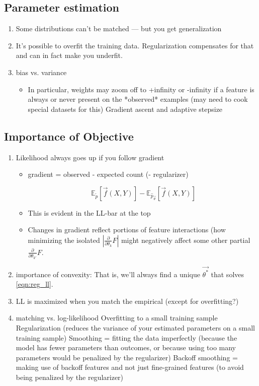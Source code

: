 \documentclass[11pt,letterpaper]{article}
\newcommand{\empirical}[0]{\ensuremath{\tilde{p}}}
\begin{document}
\subsection{Parameter estimation}
\begin{enumerate}[resume]
\item Some distributions can't be matched --- but you get generalization
\item It's possible to overfit the training data.  Regularization compensates for that and can in fact make you underfit.
\item bias vs. variance
\begin{itemize}
\item In particular, weights may zoom off to +infinity or -infinity if a feature is always or never present on the *observed* examples (may need to cook special datasets for this)
Gradient ascent and adaptive stepsize
\end{itemize}
\end{enumerate}

\subsection{Importance of Objective} %
\begin{enumerate}[resume]
\item Likelihood always goes up if you follow gradient
\begin{itemize}
\item gradient = observed - expected count (- regularizer)

\begin{equation}
\ \mathbb{E}_{\empirical{}}\left[\vec{f}(X,Y)\right] 
- \mathbb{E}_{{\hat{p}_{\vec{\theta}}}}\left[\vec{f}(X,Y)\right]
\label{eqn:obsexp} 
\end{equation}

\item This is evident in the LL-bar at the top
\item Changes in gradient reflect portions of feature interactions (how minimizing the isolated $|\frac{\partial}{\partial \theta_k} F|$ might negatively affect some other partial $\frac{\partial}{\partial \theta_{k'}}F$.
\end{itemize}
\item importance of convexity: That is, we'll always find a unique $\vec{\theta^*}$ that solves \eqref{eqn:reg_ll}.
\item LL is maximized when you match the empirical (except for overfitting?)
\item matching vs. log-likelihood
Overfitting to a small training sample
Regularization (reduces the variance of your estimated parameters on a small training sample)
Smoothing = fitting the data imperfectly
(because the model has fewer parameters than outcomes, or because using too many parameters would be penalized by the regularizer)
Backoff smoothing = making use of backoff features and not just fine-grained features
(to avoid being penalized by the regularizer)
\end{enumerate}
\end{document}
